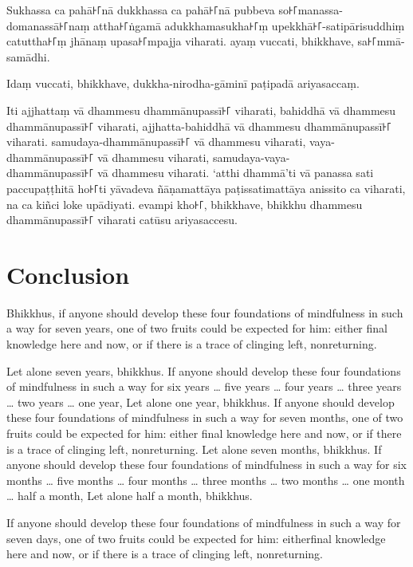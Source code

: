 Sukhassa ca pahā꜔꜒nā dukkhassa ca pahā꜔꜒nā pubbeva so꜔꜒manassa-domanassā꜔꜒naṃ attha꜔꜒ṅgamā
adukkhamasukha꜔꜒ṃ upekkhā꜔꜒-satipārisuddhiṃ catuttha꜔꜒ṃ jhānaṃ upasa꜔꜒mpajja viharati.
ayaṃ vuccati, bhikkhave, sa꜔꜒mmā-samādhi.

Idaṃ vuccati, bhikkhave, dukkha-nirodha-gāminī paṭipadā ariyasaccaṃ.

Iti ajjhattaṃ vā dhammesu dhammānupassī꜔꜒ viharati,
bahiddhā vā dhammesu dhammānupassī꜔꜒ viharati,
ajjhatta-bahiddhā vā dhammesu dhammānupassī꜔꜒ viharati.
samudaya-dhammānupassī꜔꜒ vā dhammesu viharati,
vaya-dhammānupassī꜔꜒ vā dhammesu viharati,
samudaya-vaya-\\ dhammānupassī꜔꜒ vā dhammesu viharati.
‘atthi dhammā’ti vā panassa sati paccupaṭṭhitā ho꜔꜒ti
yāvadeva ñāṇamattāya paṭissatimattāya anissito ca viharati,
na ca kiñci loke upādiyati. evampi kho꜔꜒, bhikkhave, bhikkhu
dhammesu dhammānupassī꜔꜒ viharati catūsu ariyasaccesu.



\englishPage
\chapter{Conclusion}

Bhikkhus, if anyone should develop these four foundations of mindfulness in
such a way for seven years, one of two fruits could be expected for him: either
final knowledge here and now, or if there is a trace of clinging left,
nonreturning.

Let alone seven years, bhikkhus. If anyone should develop these four
foundations of mindfulness in such a way for six years \ldots{} five years
\ldots{} four years \ldots{} three years \ldots{} two years \ldots{} one year,
Let alone one year, bhikkhus. If anyone should develop these four foundations
of mindfulness in such a way for seven months, one of two fruits could be
expected for him: either final knowledge here and now, or if there is a trace of
clinging left, nonreturning. Let alone seven months, bhikkhus. If anyone should
develop these four foundations of mindfulness in such a way for six months
\ldots{} five months \ldots{} four months \ldots{} three months \ldots{} two
months \ldots{} one month \ldots{} half a month, Let alone half a month,
bhikkhus.

If anyone should develop these four foundations of mindfulness in such a way
for seven days, one of two fruits could be expected for him: eitherfinal
knowledge here and now, or if there is a trace of clinging left, nonreturning.

